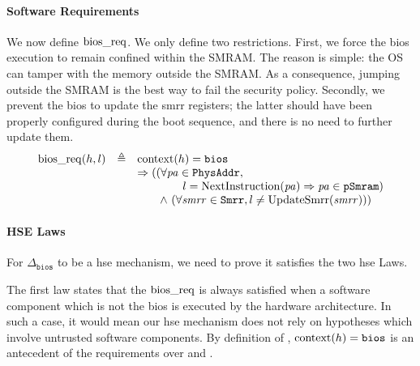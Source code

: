 \paragraph{Software Requirements}
%
We now define $\mathrm{bios\_req}$.
%
We only define two restrictions.
%
First, we force the \ac{bios} execution to remain confined within the SMRAM.
%
The reason is simple: the OS can tamper with the memory outside the SMRAM.
%
As a consequence, jumping outside the SMRAM is the best way to fail the security
policy.
%
Secondly, we prevent the \ac{bios} to update the \ac{smrr} registers;
%
the latter should have been properly configured during the boot sequence, and
there is no need to further update them.
%
\[
  \begin{array}{rcl}
    \func{bios\_req}(h, l)
    & \triangleq
    & \func{context}(h) = \val{bios} \\
    & %
    & \Rightarrow ((\forall \var{pa} \in \texttt{PhysAddr}, \\
    & %
    & \qquad\qquad l = \func{NextInstruction}(\var{pa})
      \Rightarrow \var{pa} \in \texttt{pSmram}) \\
    & %
    & \qquad\wedge~(\forall \var{smrr} \in \texttt{Smrr}, l \neq \func{UpdateSmrr}(\var{smrr})))
  \end{array}
\]

\paragraph{HSE Laws}
%
For $\Delta_{\mathtt{bios}}$ to be a \ac{hse} mechanism, we need to prove it
satisfies the two \ac{hse} Laws.

The first law states that the \( \mathrm{bios\_req} \) is always satisfied when a
software component which is not the \ac{bios} is executed by the hardware
architecture.
%
In such a case, it would mean our \ac{hse} mechanism does not rely on hypotheses
which involve untrusted software components.
%
By definition of , \( \mathrm{context}(h) = \mathtt{bios} \) is an
antecedent of the requirements over  and
.

